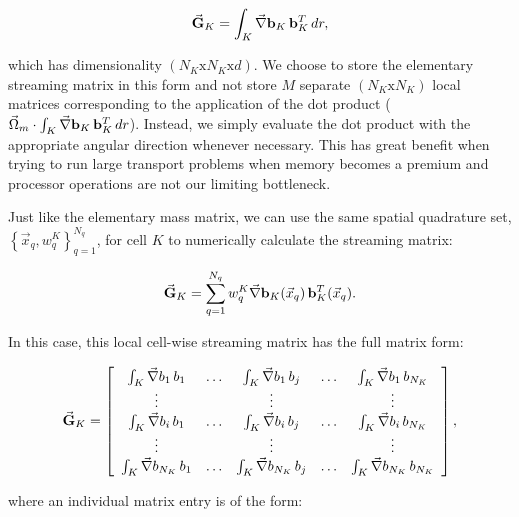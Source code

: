 \begin{equation}
\label{eq::Sn_streaming_matrix_analytical}
\vec{{\bf G}}_K =    \int_K \vec{\nabla} {\bf b}_K \, {\bf b}_K^T \, d r ,
\end{equation}

\noindent which has dimensionality $(N_K \text{x} N_K \text{x} d)$. We choose to store the elementary streaming matrix in this form and not store $M$ separate $(N_K \text{x} N_K)$ local matrices corresponding to the application of the dot product ($ \vec{\Omega}_m  \cdot \int_K  \vec{\nabla} {\bf b}_K \, {\bf b}_K^T \, d r$). Instead, we simply evaluate the dot product with the appropriate angular direction whenever necessary. This has great benefit when trying to run large transport problems when memory becomes a premium and processor operations are not our limiting bottleneck. 

Just like the elementary mass matrix, we can use the same spatial quadrature set, $\left\{  \vec{x}_q , w_q^{K}  \right\}_{q=1}^{N_q}$, for cell $K$ to numerically calculate the streaming matrix:

\begin{equation}
\label{eq::Sn_streaming_matrix_numerical}
\vec{{\bf G}}_K =    \sum_{q = 1}^{N_q} w_{q}^K \vec{\nabla} {\bf b}_K (\vec{x}_q) \, {\bf b}_K^T (\vec{x}_q) .
\end{equation}

\noindent In this case, this local cell-wise streaming matrix has the full matrix form:

\begin{equation}
\label{eq::Sn_streaming_matrix_array}
\vec{{\bf G}}_K =   \left[
\begin{array} {ccccc}
	\int_K \vec{\nabla}b_1 \, b_1  & \ldots & \int_K \vec{\nabla}b_1 \, b_j  & \ldots & \int_K \vec{\nabla}b_1 \, b_{N_K} \\
	\vdots  &  & \vdots  &  & \vdots \\
	\int_K \vec{\nabla} b_i \, b_1  & \ldots & \int_K \vec{\nabla}b_i \, b_j  & \ldots & \int_K \vec{\nabla}b_i \, b_{N_K} \\
	\vdots  &  & \vdots  &  & \vdots \\
	\int_K \vec{\nabla} b_{N_K} \, b_1  & \ldots & \int_K \vec{\nabla} b_{N_K} \, b_j  & \ldots & \int_K \vec{\nabla} b_{N_K} \, b_{N_K} \\
\end{array}
\right] ,
\end{equation}

\noindent where an individual matrix entry is of the form:

